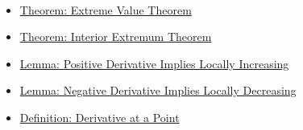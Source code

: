 \begin{remark*}[Dependencies]~\\
\begin{itemize}
  \item \hyperref[thm:extreme-value-theorem]{Theorem: Extreme Value Theorem}
  \item \hyperref[thm:interior-extremum-theorem]{Theorem: Interior Extremum Theorem}
  \item \hyperref[lem:positive-derivative-implies-locally-increasing]{Lemma: Positive Derivative Implies Locally Increasing}
  \item \hyperref[lem:negative-derivative-implies-locally-decreasing]{Lemma: Negative Derivative Implies Locally Decreasing}
  \item \hyperref[def:derivative-at-a-point]{Definition: Derivative at a Point}
\end{itemize}
\end{remark*}
